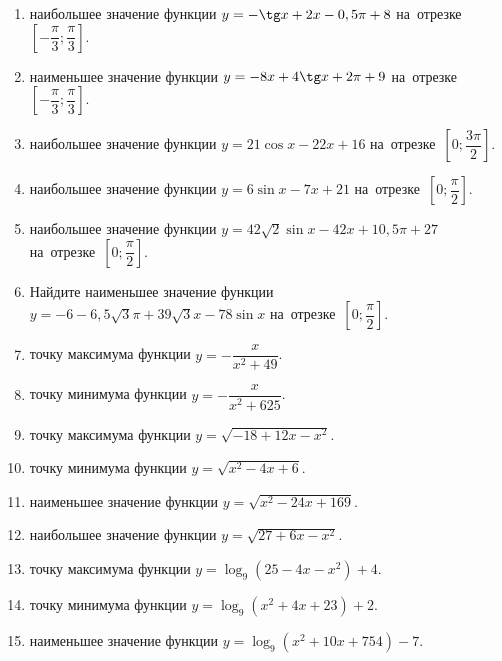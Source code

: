 \documentclass[a4paper,10pt]{article}
\begin{document}
\begin{enumerate}
\item {} наибольшее значение функции $y=-\tg x +2x-0,5\pi +8$ на~отрезке~$\left[-\dfrac{\pi}{3};\dfrac{\pi}{3}\right]$.

\item {} наименьшее значение функции $y=-8x +4\tg x+2\pi+9$ на~отрезке~$\left[-\dfrac{\pi}{3};\dfrac{\pi}{3}\right]$.

\item {} наибольшее значение функции $y=21\cos x-22x+16$ на~отрезке~$\left[0;\dfrac{3\pi}{2}\right]$.

\item {} наибольшее значение функции $y=6\sin x-7x+21$ на~отрезке~$\left[0;\dfrac{\pi}{2}\right]$.

\item {} наибольшее значение функции $y=42\sqrt{2}\sin x-42x+10,5\pi +27$ на~отрезке~$\left[0;\dfrac{\pi}{2}\right]$.

\item Найдите наименьшее значение функции $y=-6-6,5\sqrt{3}\pi+39\sqrt{3}x-78\sin x$ на~отрезке~$\left[0;\dfrac{\pi}{2}\right]$.

\item {} точку максимума функции $y=-\dfrac{x}{ x^2 +49}$.

\item {} точку минимума функции $y=-\dfrac{x}{ x^2 +625}$.

\item {} точку максимума функции $y=\sqrt{-18+12x-x^2}$.

\item {} точку минимума функции $y=\sqrt{x^2-4x+6}$.

\item {} наименьшее значение функции $y=\sqrt{x^2-24x+169}$.

\item {} наибольшее значение функции $y=\sqrt{27+6x-x^2}$.

\item {} точку максимума функции $y=\log_9\left(25-4x-x^2\right)+4$.

\item {} точку минимума функции $y=\log_9\left(x^2+4x+23\right)+2$.

\item {} наименьшее значение функции $y=\log_9\left(x^2+10x+754\right)-7$.


\end{enumerate}
\end{document}
